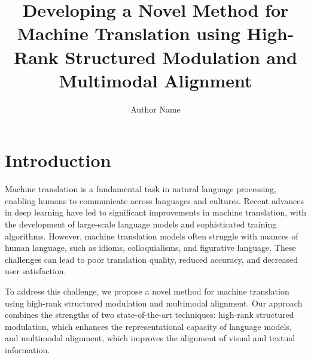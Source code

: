 \documentclass{article}
\begin{document}
\title{Developing a Novel Method for Machine Translation using High-Rank Structured Modulation and Multimodal Alignment}

\author{Author Name}

\maketitle


\section{Introduction}

Machine translation is a fundamental task in natural language processing, enabling humans to communicate across languages and cultures. Recent advances in deep learning have led to significant improvements in machine translation, with the development of large-scale language models and sophisticated training algorithms. However, machine translation models often struggle with nuances of human language, such as idioms, colloquialisms, and figurative language. These challenges can lead to poor translation quality, reduced accuracy, and decreased user satisfaction.

To address this challenge, we propose a novel method for machine translation using high-rank structured modulation and multimodal alignment. Our approach combines the strengths of two state-of-the-art techniques: high-rank structured modulation, which enhances the representational capacity of language models, and multimodal alignment, which improves the alignment of visual and textual information.
\end{document}

